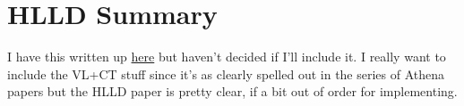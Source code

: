 \section{HLLD Summary}
\label{sec:hlld}

I have this written up \href{https://robertcaddy.com/posts/HLLD-Algorithm/}{here} but haven't decided if I'll include it. I really want to include the VL+CT stuff since it's as clearly spelled out in the series of Athena papers but the HLLD paper is pretty clear, if a bit out of order for implementing.